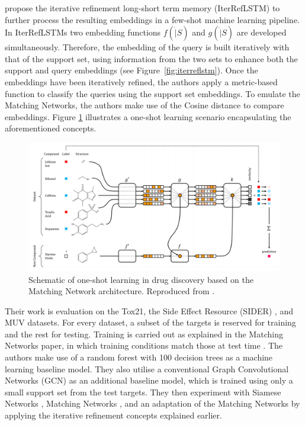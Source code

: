 \citet{altae2017low} propose the iterative refinement long-short term memory (IterRefLSTM) to further process the resulting embeddings in a few-shot machine learning pipeline. In IterRefLSTMs two embedding functions $f(\dot|S)$ and $g(\dot|S)$ are developed simultaneously. Therefore, the embedding of the query is built iteratively with that of the support set, using information from the two sets to enhance both the support and query embeddings (see Figure~\ref{fig:iterreflstm}). Once the embeddings have been iteratively refined, the authors apply a metric-based function to classify the queries using the support set embeddings. To emulate the Matching Networks, the authors make use of the Cosine distance to compare embeddings. Figure \ref{fig:schematiconeshotdrug} illustrates a one-shot learning scenario encapsulating the aforementioned concepts.

\begin{figure}[h]
	\centering
	\includegraphics[width=0.9\linewidth]{img/pandeschematic.png}
	\caption[Schematic of one-shot learning in drug discovery]{Schematic of one-shot learning in drug discovery based on the Matching Network \citep{vinyals2016matching} architecture. Reproduced from \citet{altae2017low}.}
	\label{fig:schematiconeshotdrug}
\end{figure}

Their work is evaluation on the Tox21, the Side Effect Resource (SIDER) \citep{kuhn2016sider}, and MUV datasets\citep{rohrer2009maximum}. For every dataset, a subset of the targets is reserved for training and the rest for testing. Training is carried out as explained in the Matching Networks paper, in which training conditions match those at test time \citep{vinyals2016matching}. The authors make use of a random forest with 100 decision trees as a machine learning baseline model. They also utilise a conventional Graph Convolutional Networks (GCN)\citep{kipf2016semi} as an additional baseline model, which is trained using only a small support set from the test targets. They then experiment with Siamese Networks \citep{koch2015siamese}, Matching Networks \citep{vinyals2016matching}, and an adaptation of the Matching Networks by applying the iterative refinement concepts explained earlier.

